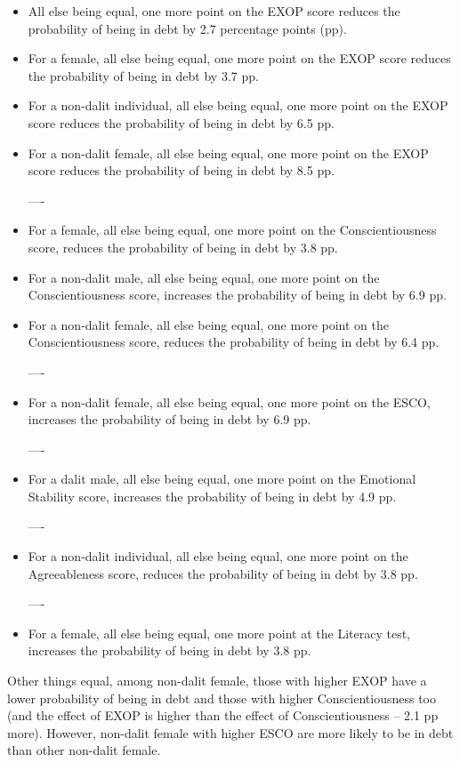 \documentclass[a4paper, 11pt, onecolumn]{article}
\begin{document}
\begin{itemize}
\item All else being equal, one more point on the EXOP score reduces the probability of being in debt by 2.7 percentage points (pp).
\item For a female, all else being equal, one more point on the EXOP score reduces the probability of being in debt by 3.7 pp.
\item For a non-dalit individual, all else being equal, one more point on the EXOP score reduces the probability of being in debt by 6.5 pp.
\item For a non-dalit female, all else being equal, one more point on the EXOP score reduces the probability of being in debt by 8.5 pp.
\item[----]
\item For a female, all else being equal, one more point on the Conscientiousness score, reduces the probability of being in debt by 3.8 pp.
\item For a non-dalit male, all else being equal, one more point on the Conscientiousness score, increases the probability of being in debt by 6.9 pp.
\item For a non-dalit female, all else being equal, one more point on the Conscientiousness score, reduces the probability of being in debt by 6.4 pp.
\item[----]
\item For a non-dalit female, all else being equal, one more point on the ESCO, increases the probability of being in debt by 6.9 pp.
\item[----] 
\item For a dalit male, all else being equal, one more point on the Emotional Stability score, increases the probability of being in debt by 4.9 pp.
\item[----]
\item For a non-dalit individual, all else being equal, one more point on the Agreeableness score, reduces the probability of being in debt by 3.8 pp.
\item[----]
\item For a female, all else being equal, one more point at the Literacy test, increases the probability of being in debt by 3.8 pp.
\end{itemize}

Other things equal, among non-dalit female, those with higher EXOP have a lower probability of being in debt and those with higher Conscientiousness too (and the effect of EXOP is higher than the effect of Conscientiousness -- 2.1 pp more). 
However, non-dalit female with higher ESCO are more likely to be in debt than other non-dalit female.
\end{document}
